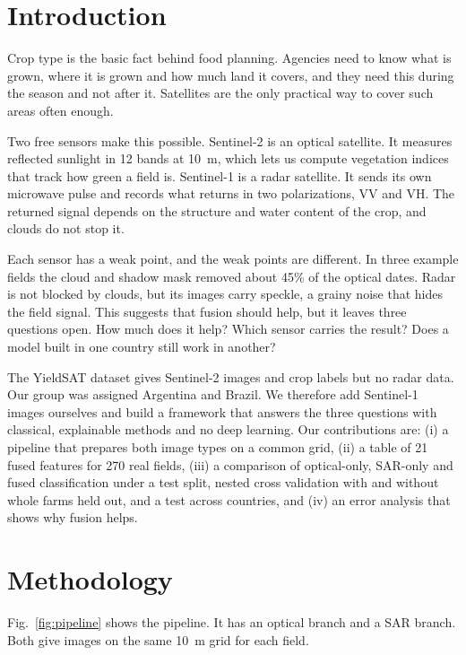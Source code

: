 \documentclass[conference]{IEEEtran}
\begin{document}
\section{Introduction}
Crop type is the basic fact behind food planning. Agencies need to know what is grown, where it is grown and how much land it covers, and they need this during the season and not after it. Satellites are the only practical way to cover such areas often enough.

Two free sensors make this possible. Sentinel-2 is an optical satellite. It measures reflected sunlight in 12 bands at 10~m, which lets us compute vegetation indices that track how green a field is. Sentinel-1 \cite{sentinel1} is a radar satellite. It sends its own microwave pulse and records what returns in two polarizations, VV and VH. The returned signal depends on the structure and water content of the crop, and clouds do not stop it.

Each sensor has a weak point, and the weak points are different. In three example fields the cloud and shadow mask removed about 45\% of the optical dates. Radar is not blocked by clouds, but its images carry speckle, a grainy noise that hides the field signal. This suggests that fusion should help, but it leaves three questions open. How much does it help? Which sensor carries the result? Does a model built in one country still work in another?

The YieldSAT dataset \cite{yieldsat} gives Sentinel-2 images and crop labels but no radar data. Our group was assigned Argentina and Brazil. We therefore add Sentinel-1 images ourselves and build a framework that answers the three questions with classical, explainable methods and no deep learning. Our contributions are: (i) a pipeline that prepares both image types on a common grid, (ii) a table of 21 fused features for 270 real fields, (iii) a comparison of optical-only, SAR-only and fused classification under a test split, nested cross validation with and without whole farms held out, and a test across countries, and (iv) an error analysis that shows why fusion helps.

\section{Methodology}
Fig.~\ref{fig:pipeline} shows the pipeline. It has an optical branch and a SAR branch. Both give images on the same 10~m grid for each field.
\end{document}
